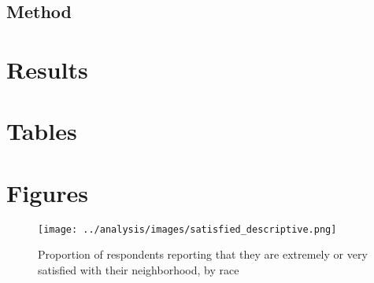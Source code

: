 \documentclass[11pt]{baderart}
\begin{document}
\subsection{Method}

\section{Results}










\section{Tables}







\section{Figures}
\begin{figure}
\centering
\texttt{[image: ../analysis/images/satisfied\_descriptive.png]}
\caption{Proportion of respondents reporting that they are extremely or very satisfied with their neighborhood, by race}
\label{fig:satisfied}
\end{figure}
\end{document}
